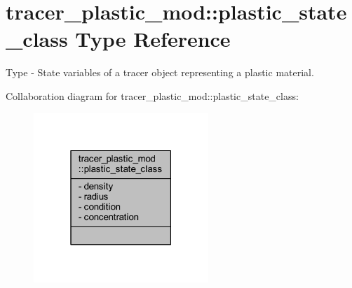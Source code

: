 \hypertarget{structtracer__plastic__mod_1_1plastic__state__class}{}\section{tracer\+\_\+plastic\+\_\+mod\+:\+:plastic\+\_\+state\+\_\+class Type Reference}
\label{structtracer__plastic__mod_1_1plastic__state__class}


Type -\/ State variables of a tracer object representing a plastic material.  




Collaboration diagram for tracer\+\_\+plastic\+\_\+mod\+:\+:plastic\+\_\+state\+\_\+class\+:\nopagebreak
\begin{figure}[H]
\begin{center}
\leavevmode
\includegraphics[width=187pt]{structtracer__plastic__mod_1_1plastic__state__class__coll__graph}
\end{center}
\end{figure}
